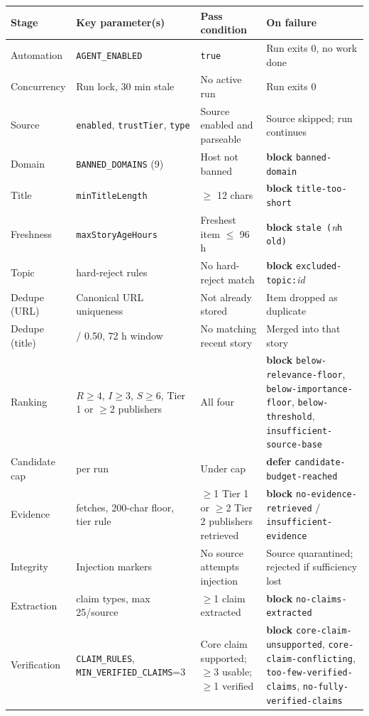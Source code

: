 \documentclass[10pt,a4paper]{article}
\newcommand{\vr}[1]{\texttt{\footnotesize\hyphenpenalty=0\exhyphenpenalty=0\relax #1}}
\newcommand{\cd}[1]{\texttt{\footnotesize\hyphenpenalty=0\exhyphenpenalty=0\relax #1}}
\newcommand{\us}{\_\discretionary{}{}{}}
\newcommand{\BL}{\textcolor{st}{\textbf{block}}}
\newcommand{\DF}{\textcolor{hd}{\textbf{defer}}}
\begin{document}
\begin{center}\footnotesize
\begin{tabularx}{\textwidth}{@{}>{\RaggedRight}p{2.5cm} >{\RaggedRight}p{4.4cm} >{\RaggedRight}X >{\RaggedRight}p{4.0cm}@{}}
\toprule
\textbf{Stage} & \textbf{Key parameter(s)} & \textbf{Pass condition} & \textbf{On failure} \\
\midrule
Automation & \vr{AGENT\us ENABLED} & \cd{true} & Run exits 0, no work done \\
Concurrency & Run lock, 30 min stale & No active run & Run exits 0 \\
Source & \cd{enabled}, \cd{trustTier}, \cd{type} & Source enabled and parseable & Source skipped; run continues \\
Domain & \cd{BANNED\us DOMAINS} (9) & Host not banned & \BL{} \cd{banned-domain} \\
Title & \cd{minTitleLength} & $\geq$ 12 chars & \BL{} \cd{title-too-short} \\
Freshness & \cd{maxStoryAgeHours} & Freshest item $\leq$ 96 h & \BL{} \cd{stale (}\textit{n}\cd{h old)} \\
Topic & 5 hard-reject rules & No hard-reject match & \BL{} \cd{excluded-topic:}\textit{id} \\
Dedupe (URL) & Canonical URL uniqueness & Not already stored & Item dropped as duplicate \\
Dedupe (title) & 0.62 / 0.50, 72 h window & No matching recent story & Merged into that story \\
Ranking & $R\geq 4$, $I\geq 3$, $S\geq 6$, Tier 1 or $\geq$2 publishers & All four & \BL{} \cd{below-relevance-floor}, \cd{below-importance-floor}, \cd{below-threshold}, \cd{insufficient-}\allowbreak\cd{source-base} \\
Candidate cap & 20 per run & Under cap & \DF{} \cd{candidate-}\allowbreak\cd{budget-reached} \\
Evidence & 4 fetches, 200-char floor, tier rule & $\geq$1 Tier 1 or $\geq$2 Tier 2 publishers retrieved & \BL{} \cd{no-evidence-retrieved} / \cd{insufficient-evidence} \\
Integrity & Injection markers & No source attempts injection & Source quarantined; rejected if sufficiency lost \\
Extraction & 8 claim types, max 25/source & $\geq$1 claim extracted & \BL{} \cd{no-claims-extracted} \\
Verification & \cd{CLAIM\us RULES}, \cd{MIN\us VERIFIED\us CLAIMS}=3 & Core claim supported; $\geq$3 usable; $\geq$1 verified & \BL{} \cd{core-claim-unsupported}, \cd{core-claim-conflicting}, \cd{too-few-}\allowbreak\cd{verified-claims}, \cd{no-fully-}\allowbreak\cd{verified-claims} \\

\end{tabularx}
\end{center}
\end{document}
